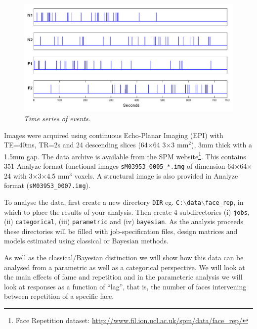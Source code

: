 \begin{figure}
\begin{center}
\includegraphics[width=140mm]{faces/face_timing}
\caption{\em Time series of events. \label{face_timing}}
\end{center}
\end{figure}

Images were acquired using continuous Echo-Planar Imaging (EPI) with TE=40ms, TR=2s and 24 descending slices (64$\times$64 3$\times$3 mm$^2$), 3mm thick with a 1.5mm gap.
The data archive is available from the SPM website\footnote{Face Repetition dataset: \url{http://www.fil.ion.ucl.ac.uk/spm/data/face_rep/}}.
This contains 351 Analyze format functional images \texttt{sM03953\_0005\_*.img} of dimension 64$\times$64$\times$24 with 3$\times$3$\times$4.5 mm$^3$ voxels. A structural image is also provided  in Analyze format (\texttt{sM03953\_0007.img}).

To analyse the data, first create a new directory \texttt{DIR} eg. \texttt{C:$\backslash$data$\backslash$face\_rep}, in which to place the results of your analysis. Then create 4 subdirectories (i) \texttt{jobs}, (ii) \texttt{categorical}, (iii)  \texttt{parametric} and (iv) \texttt{bayesian}. As the analysis proceeds these directories will be filled with job-specification files, design matrices and models estimated using classical or Bayesian methods. 

As well as the classical/Bayesian distinction we will show how this data can be analysed from a parametric as well as a categorical perspective. We will look at the 
main effects of fame and repetition and in the parameteric analysis we will look at responses as a function of ``lag'', that is, the number of faces intervening between repetition of a specific face.

